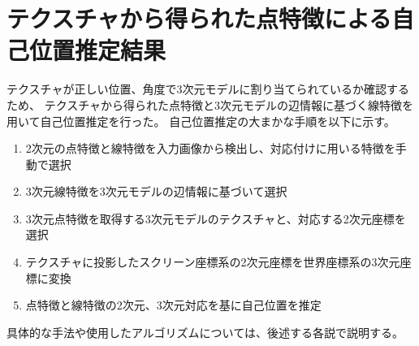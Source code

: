 \documentclass[]{jarticle}          %
\begin{document}
\section{テクスチャから得られた点特徴による自己位置推定結果}
テクスチャが正しい位置、角度で3次元モデルに割り当てられているか確認するため、
テクスチャから得られた点特徴と3次元モデルの辺情報に基づく線特徴を用いて自己位置推定を行った。
自己位置推定の大まかな手順を以下に示す。
\begin{enumerate}
  \item 2次元の点特徴と線特徴を入力画像から検出し、対応付けに用いる特徴を手動で選択
  \item 3次元線特徴を3次元モデルの辺情報に基づいて選択
  \item 3次元点特徴を取得する3次元モデルのテクスチャと、対応する2次元座標を選択
  \item テクスチャに投影したスクリーン座標系の2次元座標を世界座標系の3次元座標に変換
  \item 点特徴と線特徴の2次元、3次元対応を基に自己位置を推定
\end{enumerate}
具体的な手法や使用したアルゴリズムについては、後述する各説で説明する。
\end{document}
